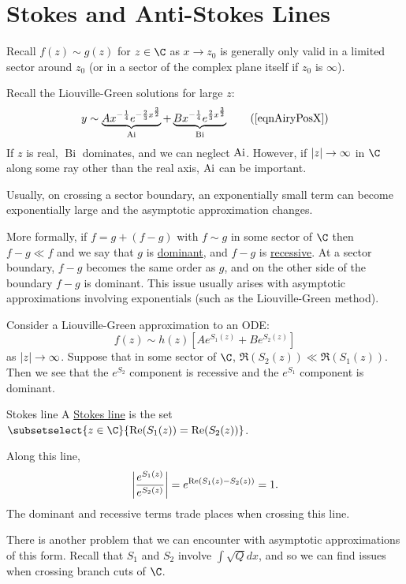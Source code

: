 \documentclass[../Main.tex]{subfiles}
\begin{document}
\section{Stokes and Anti-Stokes Lines}
Recall $f(z) \sim g(z)$ for $z \in \C$ as $x \to z_0$ is generally only valid in a limited sector around $z_0$ (or in a sector of the complex plane itself if $z_0$ is $\infty$).
\begin{example}
    Recall the Liouville-Green solutions for large $z$:
    \begin{equation*}
        y \sim \underbrace{Ax^{-\frac14} e^{-\frac23 x^{\frac32}}}_{\Ai} + \underbrace{Bx^{-\frac14} e^{\frac23 x^{\frac32}}}_{\operatorname{Bi}}
        \tag{\ref{eqnAiryPosX}}
    \end{equation*}
    If $z$ is real, $\operatorname{Bi}$ dominates, and we can neglect $\operatorname{Ai}$. However, if $\left|z\right| \to \infty$ in $\C$ along some ray other than the real axis, $\operatorname{Ai}$ can be important.
\end{example}
Usually, on crossing a sector boundary, an exponentially small term can become exponentially large and the asymptotic approximation changes.

More formally, if $f = g + (f - g)$ with $f \sim g$ in some sector of $\C$ then $f - g \ll f$ and we say that $g$ is \underline{dominant}, and $f - g$ is \underline{recessive}. At a sector boundary, $f - g$ becomes the same order as $g$, and on the other side of the boundary $f - g$ is dominant. This issue usually arises with asymptotic approximations involving exponentials (such as the Liouville-Green method).

Consider a Liouville-Green approximation to an ODE:
\begin{equation*}
    f(z) \sim h(z) \left[Ae^{S_1(z)} + Be^{S_2(z)}\right]
\end{equation*}
as $\left|z\right| \to\infty$. Suppose that in some sector of $\C$, $\Re(S_2(z)) \ll \Re(S_1(z))$. Then we see that the $e^{S_2}$ component is recessive and the $e^{S_1}$ component is dominant.
\begin{definition}{Stokes line}
    A \underline{Stokes line} is the set $\subsetselect{z \in \C}{\Re(S_1(z)) = \Re(S_2(z))}$.
\end{definition}
Along this line,
\begin{equation*}
    \left|\frac{e^{S_1(z)}}{e^{S_2(z)}}\right| = e^{\operatorname{Re}(S_1(z) - S_2(z))} = 1.
\end{equation*}
The dominant and recessive terms trade places when crossing this line.

There is another problem that we can encounter with asymptotic approximations of this form. Recall that $S_1$ and $S_2$ involve $\int \sqrt{Q} dx$, and so we can find issues when crossing branch cuts of $\C$.
\end{document}
